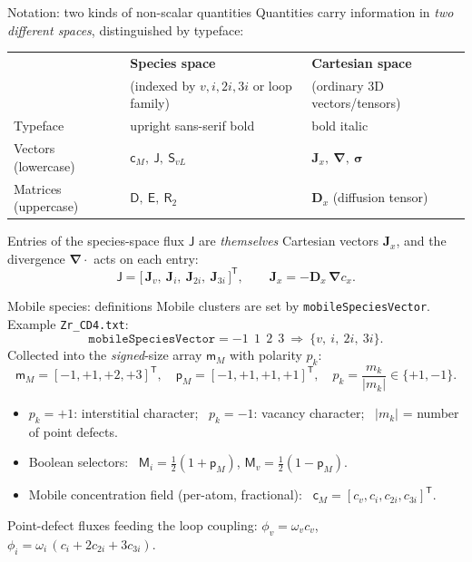 \documentclass[aspectratio=169,10pt]{beamer}
\newcommand{\sa}[1]{\bm{\mathsf{#1}}}
\newcommand{\ca}[1]{\bm{#1}}
\begin{document}
\begin{frame}{Notation: two kinds of non-scalar quantities}
\small
Quantities carry information in \emph{two different spaces}, distinguished by typeface:
\vfill
\begin{center}
\renewcommand{\arraystretch}{1.35}
\begin{tabular}{@{}p{} p{} p{}@{}}
\hline
 & \textbf{Species space} & \textbf{Cartesian space}\\
 & (indexed by $v,i,2i,3i$ or loop family) & (ordinary 3D vectors/tensors)\\
\hline
Typeface & upright sans-serif bold & bold italic\\
Vectors (lowercase) & $\sa{c}_M,\ \sa{J},\ \sa{S}_{vL}$ & $\ca{J}_x,\ \ca{\nabla},\ \ca{\sigma}$\\
Matrices (uppercase) & $\sa{D},\ \sa{E},\ \sa{R}_2$ & $\ca{D}_x$ (diffusion tensor)\\
\hline
\end{tabular}
\end{center}
\vfill
Entries of the species-space flux $\sa{J}$ are \emph{themselves} Cartesian vectors
$\ca{J}_x$, and the divergence $\ca{\nabla}\!\cdot$ acts on each entry:
\[
\sa{J}=\big[\,\ca{J}_v,\ \ca{J}_i,\ \ca{J}_{2i},\ \ca{J}_{3i}\,\big]^{\mathsf T},
\qquad
\ca{J}_x=-\ca{D}_x\,\ca{\nabla} c_x .
\]
\end{frame}

\begin{frame}{Mobile species: definitions}
\small
Mobile clusters are set by \texttt{mobileSpeciesVector}. Example \texttt{Zr\_CD4.txt}:
\[
\texttt{mobileSpeciesVector} = -1\ \ 1\ \ 2\ \ 3
\ \Rightarrow\ \{v,\ i,\ 2i,\ 3i\}.
\]
Collected into the \emph{signed}-size array $\sa{m}_M$ with polarity $p_k$:
\[
\sa{m}_M=[-1,+1,+2,+3]^{\mathsf T},\quad
\sa{p}_M=[-1,+1,+1,+1]^{\mathsf T},\quad
p_k=\frac{m_k}{|m_k|}\in\{+1,-1\}.
\]
\begin{itemize}
  \item $p_k=+1$: interstitial character; \ $p_k=-1$: vacancy character; \ $|m_k|$ = number of point defects.
  \item Boolean selectors: \ $\sa{M}_i=\tfrac12(1+\sa{p}_M)$, \quad $\sa{M}_v=\tfrac12(1-\sa{p}_M)$.
  \item Mobile concentration field (per-atom, fractional): \ $\sa{c}_M=[c_v,c_i,c_{2i},c_{3i}]^{\mathsf T}$.
\end{itemize}
\vfill
\centering
\footnotesize Point-defect fluxes feeding the loop coupling:\quad
$\phi_v=\omega_v c_v$, \qquad $\phi_i=\omega_i\,(c_i+2c_{2i}+3c_{3i})$.
\end{frame}
\end{document}
